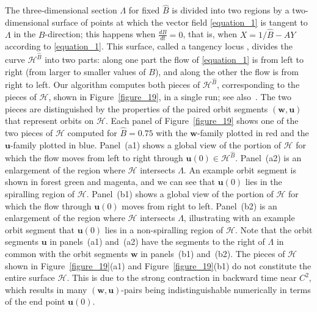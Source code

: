 \documentclass{ws-ijbc}
\begin{document}
The three-dimensional section $\Lambda$ for fixed $\widehat{B}$ is divided into two regions by a two-dimensional surface of points at which the vector field \eqref{equation_1} is tangent to $\Lambda$ in the $B$-direction; this happens when $\frac{dB}{dt} = 0$, that is, when  $X = 1/\widehat{B}  - AY$ according to \eqref{equation_1}.  This surface, called a tangency locus \cite{tangency_locus_paper}, divides the curve $\mathscr{H}^{\widehat{B}}$ into two parts: along one part the flow of \eqref{equation_1} is from left to right (from larger to smaller values of $B$), and along the other the flow is from right to left.  Our algorithm computes both pieces of $\mathscr{H}^{\widehat{B}}$, corresponding to the pieces of $\mathscr{H}$, shown in Figure~\ref{figure_19}, in a single run; see also~\cite{England}. The two pieces are distinguished by the properties of the paired orbit segments $(\mathbf{w},\mathbf{u})$ that represent orbits on $\mathscr{H}$.  Each panel of Figure~\ref{figure_19} shows one of the two pieces of $\mathscr{H}$ computed for $\widehat{B}=0.75$ with the $\mathbf{w}$-family plotted in red and the $\mathbf{u}$-family plotted in blue.  Panel~(a1) shows a global view of the portion of $\mathscr{H}$ for which the flow moves from left to right through $\mathbf{u}(0) \in \mathscr{H}^{\widehat{B}}$.  Panel~(a2) is an enlargement of the region where $\mathscr{H}$ intersects $\Lambda$.  An example orbit segment is shown in forest green and magenta, and we can see that $\mathbf{u}(0)$ lies in the spiralling region of $\mathscr{H}$. Panel~(b1) shows a global view of the portion of $\mathscr{H}$ for which the flow through $\mathbf{u}(0)$ moves from right to left.  Panel~(b2) is an enlargement of the region where $\mathscr{H}$ intersects $\Lambda$, illustrating with an example orbit segment that $\mathbf{u}(0)$ lies in a non-spiralling region of $\mathscr{H}$.  Note that the orbit segments $\mathbf{u}$ in panels~(a1) and~(a2) have the segments to the right of $\Lambda$ in common with the orbit segments $\mathbf{w}$ in panels~(b1) and~(b2).  The pieces of $\mathscr{H}$ shown in Figure~\ref{figure_19}(a1) and Figure~\ref{figure_19}(b1) do not constitute the entire surface $\mathscr{H}$.  This is due to the strong contraction in backward time near $C^2$, which results in many $(\mathbf{w},\mathbf{u})$-pairs being indistinguishable numerically in terms of the end point $\mathbf{u}(0)$.
\end{document}
